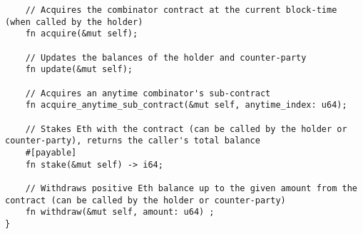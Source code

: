 \begin{lstlisting}
    // Acquires the combinator contract at the current block-time (when called by the holder)
    fn acquire(&mut self);

    // Updates the balances of the holder and counter-party
    fn update(&mut self);

    // Acquires an anytime combinator's sub-contract
    fn acquire_anytime_sub_contract(&mut self, anytime_index: u64);

    // Stakes Eth with the contract (can be called by the holder or counter-party), returns the caller's total balance
    #[payable]
    fn stake(&mut self) -> i64;

    // Withdraws positive Eth balance up to the given amount from the contract (can be called by the holder or counter-party)
    fn withdraw(&mut self, amount: u64) ;
}
\end{lstlisting}


